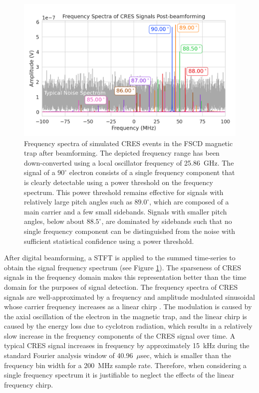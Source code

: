 \begin{figure}[ht]
    \centering
    \includegraphics[width=.7\textwidth]{figs/Chapter-4/230927_cres_signal_post_bf_examples.png}
    \caption{Frequency spectra of simulated CRES events in the FSCD magnetic trap after beamforming. The depicted frequency range has been down-converted using a local oscillator frequency of 25.86~GHz. The signal of a $90^\circ$ electron consists of a single frequency component that is clearly detectable using a power threshold on the frequency spectrum. This power threshold remains effective for signals with relatively large pitch angles such as $89.0^\circ$, which are composed of a main carrier and a few small sidebands. Signals with smaller pitch angles, below about $88.5^\circ$, are dominated by sidebands such that no single frequency component can be distinguished from the noise with sufficient statistical confidence using a power threshold.
    }
    \label{fig:signal_post_bf_example}
\end{figure}

After digital beamforming, a STFT is applied to the summed time-series to obtain the signal frequency spectrum (see Figure \ref{fig:signal_post_bf_example}). The sparseness of CRES signals in the frequency domain makes this representation better than the time domain for the purposes of signal detection. The frequency spectra of CRES signals are well-approximated by a frequency and amplitude modulated sinusoidal whose carrier frequency increases as a linear chirp \cite{p8pheno}. The modulation is caused by the axial oscillation of the electron in the magnetic trap, and the linear chirp is caused by the energy loss due to cyclotron radiation, which results in a relatively slow increase in the frequency components of the CRES signal over time. A typical CRES signal increases in frequency by approximately 15~kHz during the standard Fourier analysis window of 40.96~$\mu$sec, which is smaller than the frequency bin width for a 200~MHz sample rate. Therefore, when considering a single frequency spectrum it is justifiable to neglect the effects of the linear frequency chirp. 

